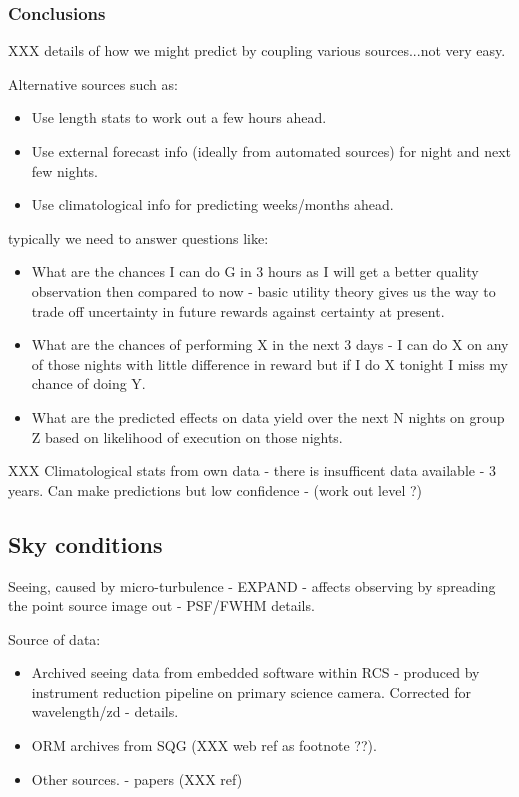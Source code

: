 {{\subsubsection{Conclusions}

XXX details of how we might predict by coupling various sources...not very easy.

Alternative sources such as:

\begin{itemize}
\item Use length stats to work out a few hours ahead.
\item Use external forecast info (ideally from automated sources) for night and next few nights.
\item Use climatological info for predicting weeks/months ahead.
\end{itemize}

typically we need to answer questions like:
\begin{itemize}
\item What are the chances I can do G in 3 hours as I will get a better quality observation then compared to now - basic utility theory gives us the way to trade off uncertainty in future rewards against certainty at present. 
\item What are the chances of performing X in the next 3 days - I can do X on any of those nights with little difference in reward but if I do X tonight I miss my chance of doing Y.
\item What are the predicted effects on data yield over the next N nights on group Z based on likelihood of execution on those nights.
\end{itemize}

XXX Climatological stats from own data - there is insufficent data available - 3 years. Can make predictions but low confidence - (work out level ?) 


\subsection{Sky conditions}

Seeing, caused by micro-turbulence - EXPAND - affects observing by spreading the point source image out - PSF/FWHM details. 

Source of data:
\begin{itemize}
\item Archived seeing data from embedded software within RCS - produced by instrument reduction pipeline on primary science camera. Corrected for wavelength/zd - details. 
\item ORM archives from SQG (XXX web ref as footnote ??).
\item Other sources. - papers (XXX ref)
\end{itemize}

}}
